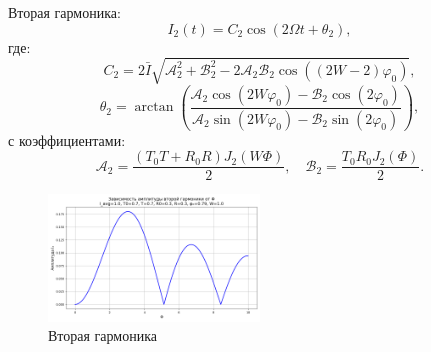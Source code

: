 \documentclass[a4paper, 12pt]{article}
\renewcommand{\phi}{\varphi}
\begin{document}
Вторая гармоника:
\[
  I_2(t) = C_2 \cos(2\Omega t + \theta_2),
\]
где:
\[
  C_2 = 2\bar I \sqrt{
    \mathcal{A}_2^2 + \mathcal{B}_2^2 - 2 \mathcal{A}_2 \mathcal{B}_2 \cos\left((2W-2)\phi_0\right)
  },
\]
\[
\theta_2 = \arctan\left(
\frac{\mathcal{A}_2 \cos(2W\phi_0) - \mathcal{B}_2 \cos(2\phi_0)}{\mathcal{A}_2 \sin(2W\phi_0) - \mathcal{B}_2 \sin(2\phi_0)}
\right),
\]
с коэффициентами:
\[
\mathcal{A}_2 = \frac{(T_0 T + R_0 R) J_2(W\Phi)}{2}, \quad \mathcal{B}_2 = \frac{T_0 R_0 J_2(\Phi)}{2}.
\]

\begin{figure}[H]
  \centering
  \includegraphics[width=0.5\textwidth]{../figures/second_harmonic_intensity_I1.0_T00.7_T0.7_R00.3_R0.3_phi0.79_W1.0.png}
  \caption{Вторая гармоника}
\end{figure}
\end{document}

